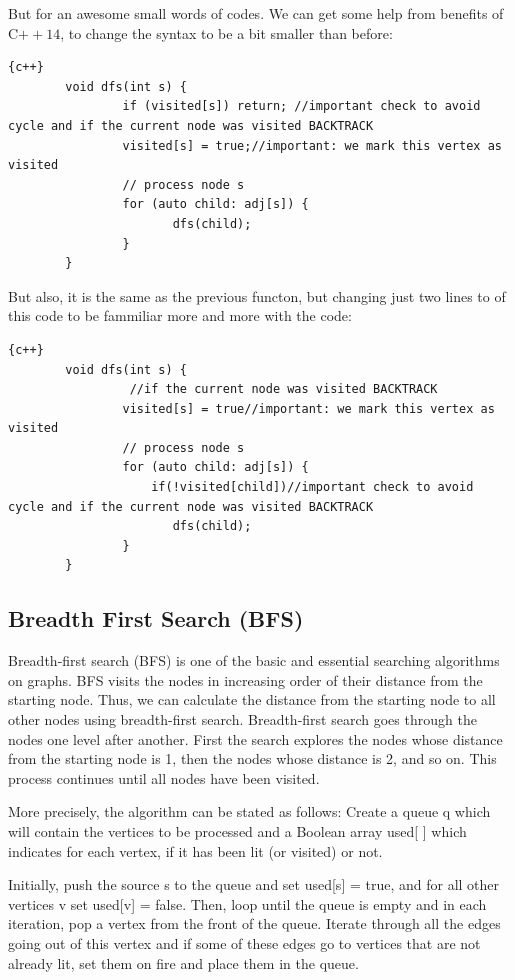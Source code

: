 But for an awesome small words of codes. We can get some help from benefits of C$++14$, to change the syntax to be a bit smaller than before:
\begin{lstlisting}{c++}
        void dfs(int s) {
                if (visited[s]) return; //important check to avoid cycle and if the current node was visited BACKTRACK 
                visited[s] = true;//important: we mark this vertex as visited
                // process node s
                for (auto child: adj[s]) {
                       dfs(child);
                }
        }
\end{lstlisting}
\newpage 
But also, it is the same as the previous functon, but changing just two lines to of this code to be fammiliar more and more with the code:
\begin{lstlisting}{c++}
        void dfs(int s) {
                 //if the current node was visited BACKTRACK 
                visited[s] = true//important: we mark this vertex as visited
                // process node s
                for (auto child: adj[s]) {
                    if(!visited[child])//important check to avoid cycle and if the current node was visited BACKTRACK 
                       dfs(child);
                }
        }
\end{lstlisting}

\newpage 

\subsection{Breadth First Search (BFS)}\label{subsec:BFS}
\hspace{7mm}Breadth-first search (BFS) is one of the basic and essential searching algorithms on graphs. BFS visits the nodes in increasing order of their distance from the starting node. Thus, we can calculate the distance from the starting node to all other nodes using breadth-first search. Breadth-first search goes through the nodes one level after another. First the search explores the nodes whose distance from the starting node is 1, then the nodes whose distance is 2, and so on. This process continues until all nodes have been visited.

\hspace{7mm}More precisely, the algorithm can be stated as follows: Create a queue q which will contain the vertices to be processed and a Boolean array used[ ] which indicates for each vertex, if it has been lit (or visited) or not.

\hspace{7mm}Initially, push the source s to the queue and set used[s] = true, and for all other vertices v set used[v] = false. Then, loop until the queue is empty and in each iteration, pop a vertex from the front of the queue. Iterate through all the edges going out of this vertex and if some of these edges go to vertices that are not already lit, set them on fire and place them in the queue.

